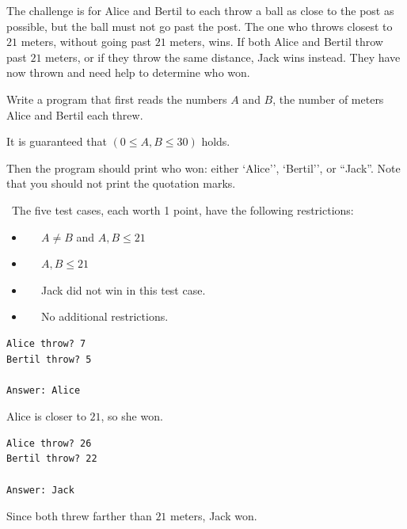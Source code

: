 The challenge is for Alice and Bertil to each throw a ball as close to the post as possible, but the ball must not go past the post.
The one who throws closest to $21$ meters, without going past $21$ meters, wins. If both Alice and Bertil throw past $21$ meters, or if they throw the same distance, Jack wins instead. They have now thrown and need help to determine who won.

Write a program that first reads the numbers $A$ and $B$, the number of meters Alice and Bertil each threw.

It is guaranteed that $(0 \leq A,B \leq 30)$ holds.

Then the program should print who won: either `Alice'', `Bertil'', or ``Jack''. Note that you should not print the quotation marks.

\
The five test cases, each worth 1 point, have the following restrictions:
\begin{itemize}
\item[(1)] $\;\;\;\;$ $A \neq B$ and $A,B \leq 21$
\item[(2)] $\;\;\;\;$ $A, B \leq 21$
\item[(3)] $\;\;\;\;$ Jack did not win in this test case.
\item[(4-5)] $\;\;\;\;$ No additional restrictions.
\end{itemize}

\vspace{1cm}
\begin{verbatim}
Alice throw? 7
Bertil throw? 5

Answer: Alice
\end{verbatim}
 Alice is closer to $21$, so she won.

\vspace{1cm}

\begin{verbatim}
Alice throw? 26
Bertil throw? 22

Answer: Jack
\end{verbatim}
 Since both threw farther than $21$ meters, Jack won.



\newpage
{}


